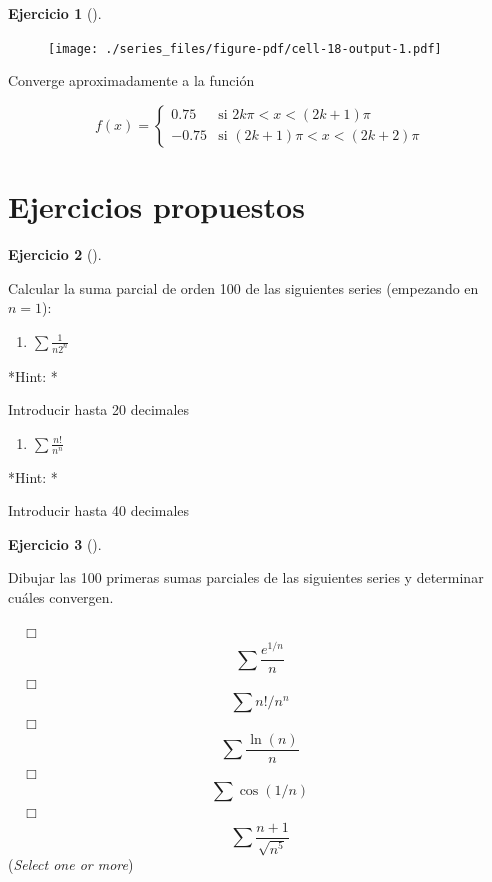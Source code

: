 \documentclass[
  a4paper,
]{scrreport}
\providecommand{\tightlist}{%
  \setlength{\itemsep}{0pt}\setlength{\parskip}{0pt}}\usepackage{longtable,booktabs,array}
\theoremstyle{definition}
\newtheorem{exercise}{Ejercicio}[chapter]
\theoremstyle{remark}
\begin{document}
\begin{exercise}[]
\begin{tcolorbox}
\begin{figure}[H]

{\centering \texttt{[image: ./series\_files/figure-pdf/cell-18-output-1.pdf]}

}

\end{figure}

Converge aproximadamente a la función

\[
f(x)=\begin{cases}
0.75 & \mbox{si $2k\pi<x<(2k+1)\pi$}\\
-0.75 & \mbox{si $(2k+1)\pi<x<(2k+2)\pi$}
\end{cases}
\]

\end{tcolorbox}

\end{exercise}

\hypertarget{ejercicios-propuestos-4}{%
\section{Ejercicios propuestos}\label{ejercicios-propuestos-4}}

\leavevmode{}%
\begin{exercise}[]\label{exr-series-propuesto-1}

Calcular la suma parcial de orden 100 de las siguientes series
(empezando en \(n=1\)):

\begin{enumerate}
\def\labelenumi{\alph{enumi}.}
\tightlist
\item
  \(\sum \frac{1}{n2^n}\)
\end{enumerate}

\vspace{18pt}*Hint: *

Introducir hasta 20 decimales

\begin{enumerate}
\def\labelenumi{\alph{enumi}.}
\setcounter{enumi}{1}
\tightlist
\item
  \(\sum \frac{n!}{n^n}\)
\end{enumerate}

\vspace{18pt}*Hint: *

Introducir hasta 40 decimales

\end{exercise}

\leavevmode{}%
\begin{exercise}[]\label{exr-series-propuesto-2}

Dibujar las 100 primeras sumas parciales de las siguientes series y
determinar cuáles convergen.

${\quad\Box}$ $$\sum \frac{e^{1/n}}{n}$$
${\quad\Box}$ $$\sum n!/n^n$$
${\quad\Box}$ $$\sum \frac{\ln(n)}{n}$$
${\quad\Box}$ $$\sum  \cos(1/n)$$
${\quad\Box}$ $$\sum \frac{n+1}{\sqrt{n^5}}$$
(\emph{Select one or more})

\end{exercise}
\end{document}
